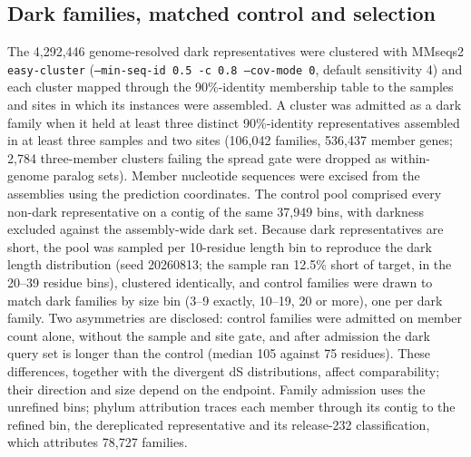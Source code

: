 \documentclass[11pt]{article}
\begin{document}
\subsection*{Dark families, matched control and selection}
The 4{,}292{,}446 genome-resolved dark representatives were clustered with MMseqs2
\texttt{easy-cluster} (\texttt{--min-seq-id 0.5 -c 0.8 --cov-mode 0}, default sensitivity 4) and each
cluster mapped through the 90\%-identity membership table to the samples and sites in which its
instances were assembled. A cluster was admitted as a dark family when it held at least three
distinct 90\%-identity representatives assembled in at least three samples and two sites (106{,}042
families, 536{,}437 member genes; 2{,}784 three-member clusters failing the spread gate were dropped
as within-genome paralog sets). Member nucleotide sequences were excised from the assemblies using the
prediction coordinates. The control pool comprised every non-dark representative on a contig of the
same 37{,}949 bins, with darkness excluded against the assembly-wide dark set. Because dark
representatives are short, the pool was sampled per 10-residue length bin to reproduce the dark
length distribution (seed 20260813; the sample ran 12.5\% short of target, in the 20--39 residue
bins), clustered identically, and control families were drawn to match dark families by size bin
(3--9 exactly, 10--19, 20 or more), one per dark family. Two asymmetries are disclosed: control
families were admitted on member count alone, without the sample and site gate, and after admission
the dark query set is longer than the control (median 105 against 75 residues). These differences, together with the divergent dS distributions, affect comparability; their
direction and size depend on the endpoint. Family admission uses the unrefined bins; phylum attribution traces each member
through its contig to the refined bin, the dereplicated representative and its release-232
classification, which attributes 78{,}727 families.
\end{document}
